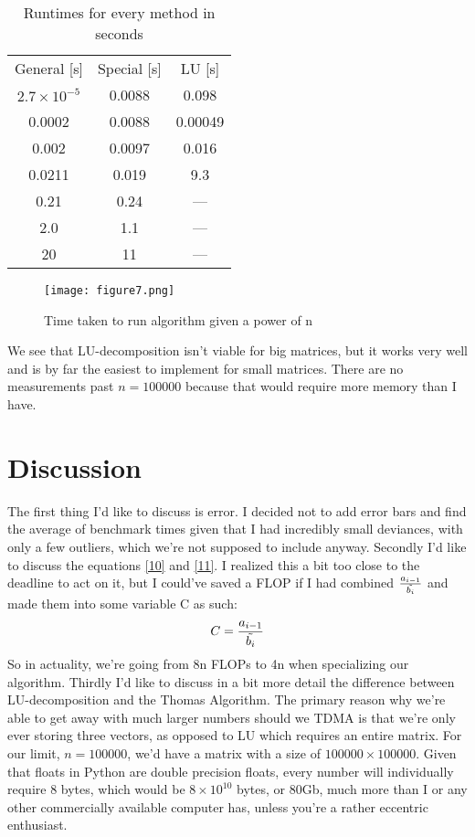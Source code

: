 \documentclass{article}
\begin{document}
\begin{table}[hbt!]
    \centering
    \begin{tabular}{c|c|c}
         General [s]& Special [s]& LU [s] \\
         $2.7\times 10^{-5}$& 0.0088& 0.098 \\
         0.0002& 0.0088& 0.00049 \\
         0.002& 0.0097& 0.016 \\
         0.0211 & 0.019& 9.3 \\
         0.21 & 0.24& --- \\
         2.0 & 1.1& --- \\
         20 & 11& --- \\
    \end{tabular}
    \caption{Runtimes for every method in seconds}
    \label{tab:1}
\clearpage
\end{table}
\begin{figure}[h]
    \centering
    \texttt{[image: figure7.png]}
    \caption{Time taken to run algorithm given a power of n}
    \label{fig:4}
\end{figure}
We see that LU-decomposition isn't viable for big matrices, but it works very well and is by far the easiest to implement for small matrices. There are no measurements past $n=100000$ because that would require more memory than I have.
\section{Discussion}
The first thing I'd like to discuss is error. I decided not to add error bars and find the average of benchmark times given that I had incredibly small deviances, with only a few outliers, which we're not supposed to include anyway.
Secondly I'd like to discuss the equations \ref{10} and \ref{11}. I realized this a bit too close to the deadline to act on it, but I could've saved a FLOP if I had combined $\frac{a_{i-1}}{\Tilde{b_i}}$ and made them into some variable C as such:
\begin{equation*}
    C=\frac{a_{i-1}}{\Tilde{b_i}}
\end{equation*}
So in actuality, we're going from 8n FLOPs to 4n when specializing our algorithm.
Thirdly I'd like to discuss in a bit more detail the difference between LU-decomposition and the Thomas Algorithm. The primary reason why we're able to get away with much larger numbers should we TDMA is that we're only ever storing three vectors, as opposed to LU which requires an entire matrix. For our limit, $n=100000$, we'd have a matrix with a size of $100000\times 100000$. Given that floats in Python are double precision floats, every number will individually require 8 bytes, which would be $8 \times 10^{10}$ bytes, or 80Gb, much more than I or any other commercially available computer has, unless you're a rather eccentric enthusiast.
\end{document}
